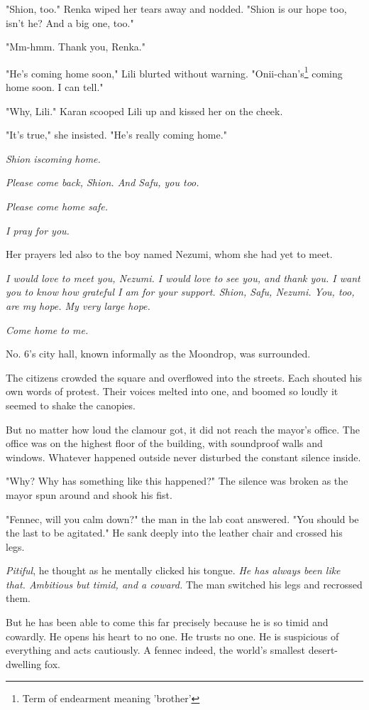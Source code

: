 "Shion, too." Renka wiped her tears away and nodded. "Shion is our hope
too, isn't he? And a big one, too."

"Mm-hmm. Thank you, Renka."

"He's coming home soon," Lili blurted without warning. "Onii-chan's\footnote{Term of endearment meaning 'brother'}
coming home soon. I can tell."

"Why, Lili." Karan scooped Lili up and kissed her on the cheek.

"It's true," she insisted. "He's really coming home."

\emph{Shion is\el coming home.}

\emph{Please come back, Shion. And Safu, you too.}

\emph{Please come home safe.}

\emph{I pray for you.}

Her prayers led also to the boy named Nezumi, whom she had yet to meet.

\emph{I would love to meet you, Nezumi. I would love to see you, and thank
you. I want you to know how grateful I am for your support. Shion, Safu,
Nezumi. You, too, are my hope. My very large hope.}

\emph{Come home to me.}

\myspace

No. 6's city hall, known informally as the Moondrop, was surrounded.

The citizens crowded the square and overflowed into the streets. Each
shouted his own words of protest. Their voices melted into one, and
boomed so loudly it seemed to shake the canopies.

But no matter how loud the clamour got, it did not reach the mayor's
office. The office was on the highest floor of the building, with
soundproof walls and windows. Whatever happened outside never disturbed
the constant silence inside.

"Why? Why has something like this happened?" The silence was broken as
the mayor spun around and shook his fist.

"Fennec, will you calm down?" the man in the lab coat answered. "You
should be the last to be agitated." He sank deeply into the leather
chair and crossed his legs.

\emph{Pitiful}, he thought as he mentally clicked his tongue. \emph{He has always
been like that. Ambitious but timid, and a coward.} The man switched his
legs and recrossed them.

But he has been able to come this far precisely because he is so timid
and cowardly. He opens his heart to no one. He trusts no one. He is
suspicious of everything and acts cautiously. A fennec indeed, the
world's smallest desert-dwelling fox.

